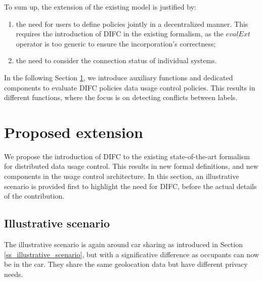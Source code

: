 To sum up, the extension of the existing model is justified by:
\begin{enumerate}
    \item the need for users to define policies jointly in a decentralized manner. This requires the introduction of DIFC in the existing formalism, as the $\underline{evalExt}$ operator is too generic to ensure the incorporation's correctness; 
    \item the need to consider the connection status of individual systems.
\end{enumerate}
In the following Section \ref{S_proposed_extension}, we introduce auxiliary functions and dedicated components to evaluate DIFC policies  data usage control policies. This results in different functions, where the focus is on detecting conflicts between labels. 


\section{Proposed extension}
\label{S_proposed_extension}

We propose the introduction of DIFC to the existing state-of-the-art formalism for distributed data usage control. This results in new formal definitions, and new components in the usage control architecture. 
In this section, an illustrative scenario is provided first to highlight the need for DIFC, before the actual details of the contribution.

\subsection{Illustrative scenario}
\label{ss_illustrative_scenario_difc}
  The illustrative scenario is again around car sharing as introduced in Section \ref{ss_illustrative_scenario}, but with a significative difference as occupants can now be in the car. They share the same geolocation data but have different privacy needs.

